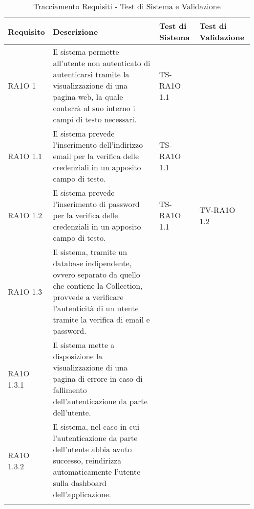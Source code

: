 	\begin{center}
	\def\arraystretch{1.5}
	\bgroup
		\begin{longtable}{| p{2cm} | p{6cm} | p{2.5cm} | p{2.5cm} | }
		\hline 
		 \textbf{Requisito} & \textbf{Descrizione} & \textbf{Test di Sistema} & \textbf{Test di Validazione} \\ \hline
					RA1O 1 & 
					Il sistema permette all'utente non autenticato di autenticarsi tramite la visualizzazione di una pagina web, la quale conterrà al suo interno i campi di testo necessari.  & TS-RA1O 1.1 & \\ \hline 
					RA1O 1.1 & 
					Il sistema prevede l'inserimento dell'indirizzo email per la verifica delle credenziali in un apposito campo di testo. & TS-RA1O 1.1 & \\ \hline 
					RA1O 1.2 & 
					Il sistema prevede l'inserimento di password per la verifica delle credenziali in un apposito campo di testo. & TS-RA1O 1.1 &TV-RA1O 1.2 \\ \hline 
					RA1O 1.3 & 
					Il sistema, tramite un database indipendente, ovvero separato da quello che contiene la Collection, provvede a verificare l'autenticità  di un utente tramite la verifica di email e password. &  &  \\ \hline 
					RA1O 1.3.1 & 
					Il sistema mette a disposizione la visualizzazione di una pagina di errore in caso di fallimento dell'autenticazione da parte dell'utente. &  &  \\ \hline 
					RA1O 1.3.2 & 
					Il sistema, nel caso in cui l'autenticazione da parte dell'utente abbia avuto successo, reindirizza automaticamente l'utente sulla dashboard dell'applicazione. &  &  \\ \hline 
		\caption{Tracciamento Requisiti - Test di Sistema e Validazione}
		\end{longtable}
	 \egroup
\end{center}
\clearpage
